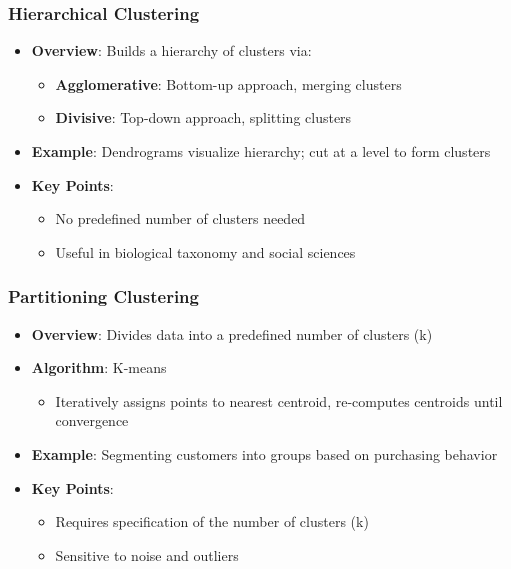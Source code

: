 \documentclass[aspectratio=169]{beamer}
\begin{document}
\begin{frame}[fragile]
    \frametitle{Hierarchical Clustering}
    \begin{itemize}
        \item \textbf{Overview}: Builds a hierarchy of clusters via:
            \begin{itemize}
                \item \textbf{Agglomerative}: Bottom-up approach, merging clusters
                \item \textbf{Divisive}: Top-down approach, splitting clusters
            \end{itemize}
        \item \textbf{Example}: Dendrograms visualize hierarchy; cut at a level to form clusters
        \item \textbf{Key Points}:
            \begin{itemize}
                \item No predefined number of clusters needed
                \item Useful in biological taxonomy and social sciences
            \end{itemize}
    \end{itemize}
\end{frame}

\begin{frame}[fragile]
    \frametitle{Partitioning Clustering}
    \begin{itemize}
        \item \textbf{Overview}: Divides data into a predefined number of clusters (k)
        \item \textbf{Algorithm}: K-means
            \begin{itemize}
                \item Iteratively assigns points to nearest centroid, re-computes centroids until convergence
            \end{itemize}
        \item \textbf{Example}: Segmenting customers into groups based on purchasing behavior
        \item \textbf{Key Points}:
            \begin{itemize}
                \item Requires specification of the number of clusters (k)
                \item Sensitive to noise and outliers
            \end{itemize}
    \end{itemize}
\end{frame}
\end{document}

